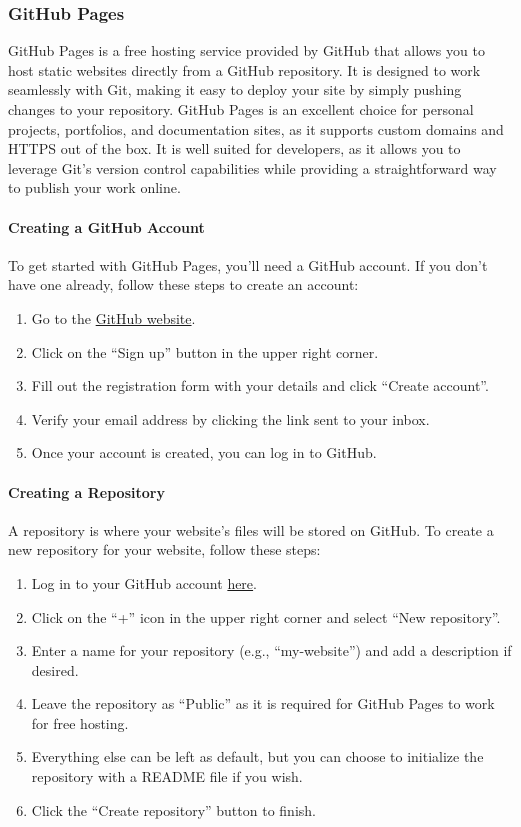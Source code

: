 \subsubsection{GitHub Pages}
GitHub Pages is a free hosting service provided by GitHub that allows you to host static websites directly from a GitHub repository. It is designed to work seamlessly with Git, making it easy to deploy your site by simply pushing changes to your repository. GitHub Pages is an excellent choice for personal projects, portfolios, and documentation sites, as it supports custom domains and HTTPS out of the box. It is well suited for developers, as it allows you to leverage Git's version control capabilities while providing a straightforward way to publish your work online.

\paragraph{Creating a GitHub Account}
To get started with GitHub Pages, you'll need a GitHub account. If you don't have one already, follow these steps to create an account:
\begin{enumerate}
    \item Go to the \href{https://github.com/}{GitHub website}.
    \item Click on the ``Sign up'' button in the upper right corner.
    \item Fill out the registration form with your details and click ``Create account''.
    \item Verify your email address by clicking the link sent to your inbox.
    \item Once your account is created, you can log in to GitHub.
\end{enumerate}

\paragraph{Creating a Repository}
A repository is where your website's files will be stored on GitHub. To create a new repository for your website, follow these steps:
\begin{enumerate}
    \item Log in to your GitHub account \href{https://github.com/login}{here}.
    \item Click on the ``+'' icon in the upper right corner and select ``New repository''.
    \item Enter a name for your repository (e.g., ``my-website'') and add a description if desired.
    \item Leave the repository as ``Public'' as it is required for GitHub Pages to work for free hosting.
    \item Everything else can be left as default, but you can choose to initialize the repository with a README file if you wish.
    \item Click the ``Create repository'' button to finish.
\end{enumerate}

